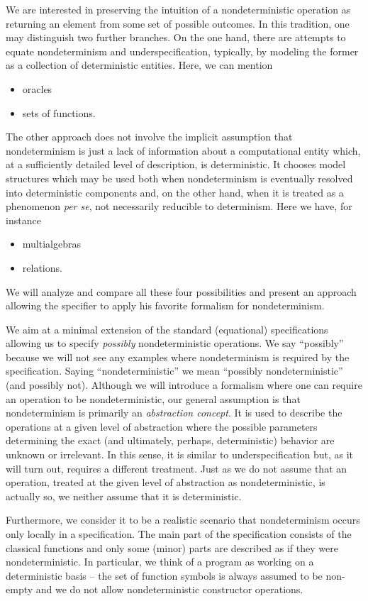 We are interested in preserving the intuition of a nondeterministic operation as returning an element from some set of possible outcomes. In this tradition, one may distinguish
two further branches. On the one hand, there are attempts to equate nondeterminism and
underspecification, typically, by modeling the former as a collection of deterministic entities. Here, we can mention \begin{itemize}\MyLPar
\item oracles
\item sets of functions.
\end{itemize}
The other approach does not involve the implicit assumption that nondeterminism
is just a lack of information about a computational entity which, at a sufficiently detailed
level of description, is deterministic. It chooses model structures which may be used both when nondeterminism is eventually resolved into deterministic components and, on the other hand, when it is treated as a phenomenon {\em per
se}, not necessarily reducible to determinism. Here we have, for instance \begin{itemize}\MyLPar
\item multialgebras
\item relations.
\end{itemize}
We will analyze and compare all these four possibilities and present an approach allowing the specifier to apply his favorite formalism for nondeterminism.

We aim at a minimal extension of the standard (equational) specifications allowing
us to specify {\em possibly} nondeterministic operations. We say ``possibly'' because we will not see any examples where nondeterminism is required by the specification. Saying ``nondeterministic'' we mean ``possibly nondeterministic''
(and possibly not). Although we will introduce a formalism where 
one can
require an operation to be nondeterministic, our general assumption is that nondeterminism is primarily an {\em abstraction concept}. It is used to describe the operations at a given level of abstraction where the possible parameters determining the exact (and ultimately, perhaps, deterministic) behavior are unknown or irrelevant. In this sense, it is similar to underspecification but, as it will turn out, requires a different treatment. Just as we do not assume that an operation, treated at the given level of abstraction as nondeterministic, is actually so, we neither assume that it is deterministic.

Furthermore, we consider it to be a realistic scenario that nondeterminism occurs
only locally in a specification. The main part of the specification consists of the classical functions and only some (minor) parts are described as if
they were nondeterministic. In particular, we think of a program as working on a deterministic basis -- the set of function symbols is always assumed to be non-empty and we do not allow nondeterministic constructor operations. 

